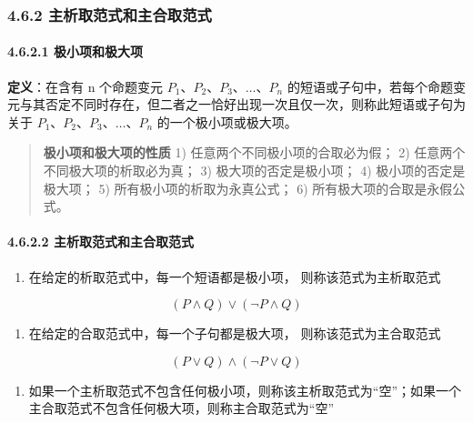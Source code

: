 \subsubsection{4.6.2
主析取范式和主合取范式}\label{ux4e3bux6790ux53d6ux8303ux5f0fux548cux4e3bux5408ux53d6ux8303ux5f0f}

\paragraph{4.6.2.1
极小项和极大项}\label{ux6781ux5c0fux9879ux548cux6781ux5927ux9879}

\textbf{定义}：在含有 n 个命题变元 \(P_1、P_2、P_3、…、 P_n\)
的短语或子句中，若每个命题变元与其否定不同时存在，但二者之一恰好出现一次且仅一次，则称此短语或子句为关于
\(P_1、P_2、P_3、…、P_n\) 的一个极小项或极大项。

\begin{quote}
\textbf{极小项和极大项的性质} 1) 任意两个不同极小项的合取必为假； 2)
任意两个不同极大项的析取必为真； 3) 极大项的否定是极小项； 4)
极小项的否定是极大项； 5) 所有极小项的析取为永真公式； 6)
所有极大项的合取是永假公式。
\end{quote}

\paragraph{4.6.2.2
主析取范式和主合取范式}\label{ux4e3bux6790ux53d6ux8303ux5f0fux548cux4e3bux5408ux53d6ux8303ux5f0f-1}

\begin{enumerate}
\def\labelenumi{\arabic{enumi}.}
\tightlist
\item
  在给定的析取范式中，每一个短语都是极小项， 则称该范式为主析取范式
\end{enumerate}

\[
(P\land Q)\lor(\lnot P \land Q)
\]

\begin{enumerate}
\def\labelenumi{\arabic{enumi}.}
\setcounter{enumi}{1}
\tightlist
\item
  在给定的合取范式中，每一个子句都是极大项， 则称该范式为主合取范式
\end{enumerate}

\[
(P\lor Q)\land(\lnot P \lor Q)
\]

\begin{enumerate}
\def\labelenumi{\arabic{enumi}.}
\setcounter{enumi}{2}
\tightlist
\item
  如果一个主析取范式不包含任何极小项，则称该主析取范式为``空''；如果一个主合取范式不包含任何极大项，则称主合取范式为``空''
\end{enumerate}

